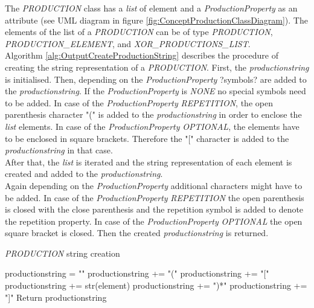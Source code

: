 The \textit{PRODUCTION} class has a \textit{list} of element and a \textit{ProductionProperty} as an attribute (see UML diagram in figure \ref{fig:ConceptProductionClassDiagram}).
The elements of the list of a \textit{PRODUCTION} can be of type \textit{PRODUCTION}, \textit{PRODUCTION_ELEMENT}, and \textit{XOR_PRODUCTIONS_LIST}.\\
Algorithm \ref{alg:OutputCreateProductionString} describes the procedure of creating the string representation of a \textit{PRODUCTION}.
First, the \textit{production\textunderscore string} is initialised.
Then, depending on the \textit{ProductionProperty} ?symbols? are added to the \textit{production\textunderscore string}.
If the \textit{ProductionProperty} is \textit{NONE} no special symbols need to be added.
In case of the \textit{ProductionProperty} \textit{REPETITION}, the open parenthesis character "(" is added to the \textit{production\textunderscore string} in order to enclose the \textit{list} elements.
In case of the \textit{ProductionProperty} \textit{OPTIONAL}, the elements have to be enclosed in square brackets. Therefore the "[" character is added to the \textit{production\textunderscore string} in that case.\\
After that, the \textit{list} is iterated and the string representation of each element is created and added to the \textit{production\textunderscore string}.\\
Again depending on the \textit{ProductionProperty} additional characters might have to be added.
In case of the \textit{ProductionProperty} \textit{REPETITION} the open parenthesis is closed with the close parenthesis and the repetition symbol is added to denote the repetition property.
In case of the \textit{ProductionProperty} \textit{OPTIONAL} the open square bracket is closed.
Then the created \textit{production\textunderscore string} is returned.

\begin{algorithm}[H]
\caption{\textit{PRODUCTION} string creation}
\label{alg:OutputCreateProductionString}
\begin{algorithmic}[1]
\State production\textunderscore string = ""
	\State production\textunderscore string += "("
	\State production\textunderscore string += "["
\EndIf
{}
		\State production\textunderscore string += str(element)
\EndFor
{}
	\State production\textunderscore string += ")*"
	\State production\textunderscore string += "]"
\EndIf
\State Return production\textunderscore string
\end{algorithmic}
\end{algorithm}

